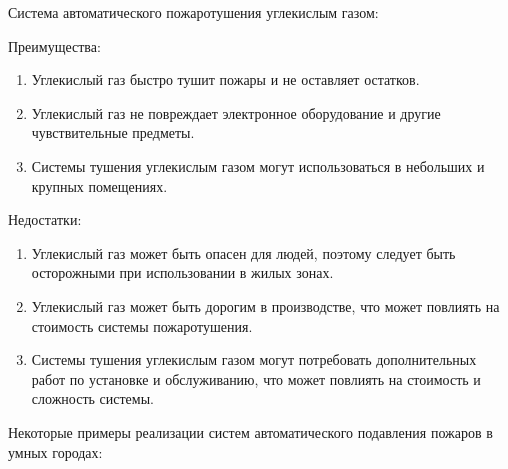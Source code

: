 \begin{multicols}{2}
Система автоматического пожаротушения углекислым газом:

Преимущества:

\begin{enumerate}
\def\labelenumi{\arabic{enumi}.}
\item
  Углекислый газ быстро тушит пожары и не оставляет остатков.
\item
  Углекислый газ не повреждает электронное оборудование и другие
  чувствительные предметы.
\item
  Системы тушения углекислым газом могут использоваться в небольших и
  крупных помещениях.
\end{enumerate}

Недостатки:

\begin{enumerate}
\def\labelenumi{\arabic{enumi}.}
\item
  Углекислый газ может быть опасен для людей, поэтому следует быть
  осторожными при использовании в жилых зонах.
\item
  Углекислый газ может быть дорогим в производстве, что может повлиять
  на стоимость системы пожаротушения.
\item
  Системы тушения углекислым газом могут потребовать дополнительных
  работ по установке и обслуживанию, что может повлиять на стоимость и
  сложность системы.
\end{enumerate}

Некоторые примеры реализации систем автоматического подавления пожаров в
умных городах:


\end{multicols}
